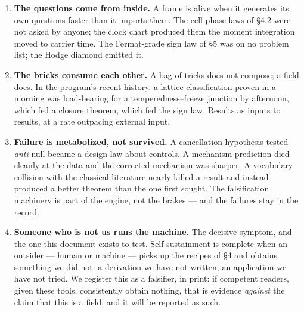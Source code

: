 \documentclass[11pt]{article}
\begin{document}
\begin{enumerate}
\item \textbf{The questions come from inside.}  A frame is alive when it
generates its own questions faster than it imports them.  The cell-phase laws of
\S4.2 were not asked by anyone; the clock chart produced them the moment
integration moved to carrier time.  The Fermat-grade sign law of \S5 was on no
problem list; the Hodge diamond emitted it.
\item \textbf{The bricks consume each other.}  A bag of tricks does not
compose; a field does.  In the program's recent history, a lattice
classification proven in a morning was load-bearing for a
temperedness--freeze junction by afternoon, which fed a closure theorem, which
fed the sign law.  Results as inputs to results, at a rate outpacing external
input.
\item \textbf{Failure is metabolized, not survived.}  A cancellation
hypothesis tested \emph{anti}-null became a design law about controls.  A
mechanism prediction died cleanly at the data and the corrected mechanism was
sharper.  A vocabulary collision with the classical literature nearly killed a
result and instead produced a better theorem than the one first sought.  The
falsification machinery is part of the engine, not the brakes --- and the
failures stay in the record.
\item \textbf{Someone who is not us runs the machine.}  The decisive symptom,
and the one this document exists to test.  Self-sustainment is complete when an
outsider --- human or machine --- picks up the recipes of \S4 and obtains
something we did not: a derivation we have not written, an application we have
not tried.  We register this as a falsifier, in print: if competent readers,
given these tools, consistently obtain nothing, that is evidence \emph{against}
the claim that this is a field, and it will be reported as such.
\end{enumerate}
\end{document}
